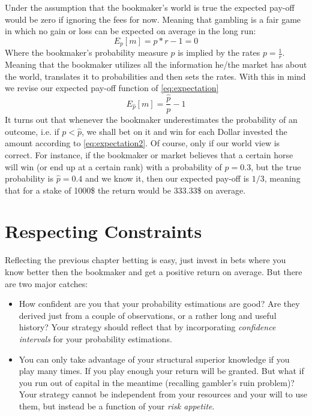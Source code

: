 \documentclass{article}
\begin{document}
Under the assumption that the bookmaker's world is true the expected pay-off would be zero if ignoring the fees for now. Meaning that gambling is a fair game in which no gain or loss can be expected on average in the long run:
$$E_{p}[m] = p * r -1 = 0$$
Where the bookmaker's probability measure $p$ is implied by the rates $p = \frac{1}{r}$. Meaning that the bookmaker utilizes all the information he/the market has about the world, translates it to probabilities and then sets the rates. With this in mind we revise our expected pay-off function of \eqref{eq:expectation}
\begin{equation}\label{eq:expectation2}
 E_{\hat p}[m] = \frac{\hat p }{p} -1
\end{equation}
It turns out that whenever the bookmaker underestimates the probability of an outcome, i.e. if $p<\hat p$, we shall bet on it and win for each Dollar invested the amount according to \eqref{eq:expectation2}. Of course, only if our world view is correct.
For instance, if the bookmaker or market believes that a certain horse will win (or end up at a certain rank) with a probability of $p=0.3$, but the true probability is $\hat p=0.4$ and we know it, then our expected pay-off is $1/3$, meaning that for a stake of 1000\$ the return would be 333.33\$ on average.

\section{Respecting Constraints}
Reflecting the previous chapter betting is easy, just invest in bets where you know better then the bookmaker and get a positive return on average. But there are two major catches:
\begin{itemize}
\item How confident are you that your probability estimations are good? Are they derived just from a couple of observations, or a rather long and useful history? Your strategy should reflect that by incorporating \emph{confidence intervals} for your probability estimations.
\item You can only take advantage of your structural superior knowledge if you play many times. If you play enough your return will be granted. But what if you run out of capital in the meantime (recalling gambler's ruin problem)? Your strategy cannot be independent from your resources and your will to use them, but instead be a function of your \emph{risk appetite}. 
\end{itemize} 
\end{document}
